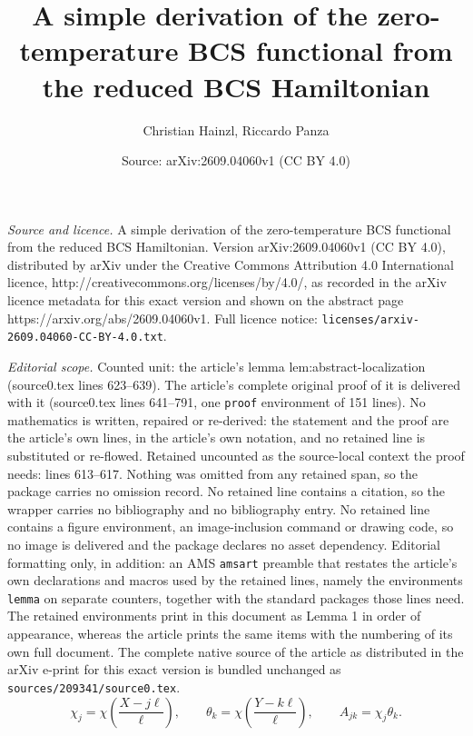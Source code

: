 \documentclass[10pt,a4paper]{amsart}
\title{A simple derivation of the zero-temperature BCS functional from the reduced BCS Hamiltonian}
\author{Christian Hainzl, Riccardo Panza}
\date{Source: arXiv:2609.04060v1 (CC BY 4.0)}
\begin{document}
\maketitle

\noindent\emph{Source and licence.} A simple derivation of the zero-temperature BCS functional from the reduced BCS Hamiltonian. Version arXiv:2609.04060v1 (CC BY 4.0), distributed by arXiv under the Creative Commons Attribution 4.0 International licence, http://creativecommons.org/licenses/by/4.0/, as recorded in the arXiv licence metadata for this exact version and shown on the abstract page https://arxiv.org/abs/2609.04060v1. Full licence notice: \texttt{licenses/arxiv-2609.04060-CC-BY-4.0.txt}.\par\smallskip

\noindent\textit{Editorial scope.} Counted unit: the article's lemma lem:abstract-localization (source0.tex lines 623--639). The article's complete original proof of it is delivered with it (source0.tex lines 641--791, one \texttt{proof} environment of 151 lines). No mathematics is written, repaired or re-derived: the statement and the proof are the article's own lines, in the article's own notation, and no retained line is substituted or re-flowed.  Retained uncounted as the source-local context the proof needs: lines 613--617.  Nothing was omitted from any retained span, so the package carries no omission record.  No retained line contains a citation, so the wrapper carries no bibliography and no bibliography entry.  No retained line contains a figure environment, an image-inclusion command or drawing code, so no image is delivered and the package declares no asset dependency.  Editorial formatting only, in addition: an AMS \texttt{amsart} preamble that restates the article's own declarations and macros used by the retained lines, namely the environments \texttt{lemma} on separate counters, together with the standard packages those lines need.  The retained environments print in this document as Lemma 1 in order of appearance, whereas the article prints the same items with the numbering of its own full document.  The complete native source of the article as distributed in the arXiv e-print for this exact version is bundled unchanged as \texttt{sources/209341/source0.tex}.
\begin{equation}\label{eq:chi-theta}
 \chi_j=\chi\left(\frac{X-j\ell}{\ell}\right),\qquad
 \theta_k=\chi\left(\frac{Y-k\ell}{\ell}\right),\qquad
 A_{jk}=\chi_j\theta_k.
\end{equation}
\end{document}
